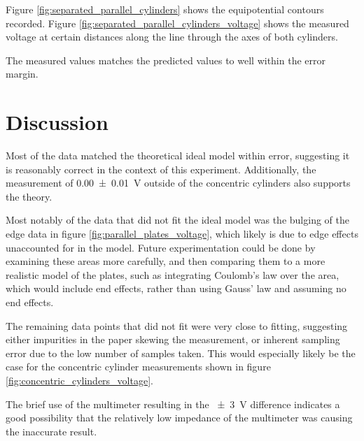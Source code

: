 \documentclass[a4paper]{scrartcl}
\begin{document}
Figure \ref{fig:separated_parallel_cylinders} shows the equipotential contours recorded. Figure \ref{fig:separated_parallel_cylinders_voltage} shows the measured voltage at certain distances along the line through the axes of both cylinders.

The measured values matches the predicted values to well within the error margin.

\section{Discussion}
Most of the data matched the theoretical ideal model within error, suggesting it is reasonably correct in the context of this experiment. Additionally, the measurement of \SI{0.00 \pm 0.01}{\volt} outside of the concentric cylinders also supports the theory.

Most notably of the data that did not fit the ideal model was the bulging of the edge data in figure \ref{fig:parallel_plates_voltage}, which likely is due to edge effects unaccounted for in the model. Future experimentation could be done by examining these areas more carefully, and then comparing them to a more realistic model of the plates, such as integrating Coulomb's law over the area, which would include end effects, rather than using Gauss' law and assuming no end effects.

The remaining data points that did not fit were very close to fitting, suggesting either impurities in the paper skewing the measurement, or inherent sampling error due to the low number of samples taken. This would especially likely be the case for the concentric cylinder measurements shown in figure \ref{fig:concentric_cylinders_voltage}.

The brief use of the multimeter resulting in the \SI{\pm 3}{\volt} difference indicates a good possibility that the relatively low impedance of the multimeter was causing the inaccurate result.
\end{document}

